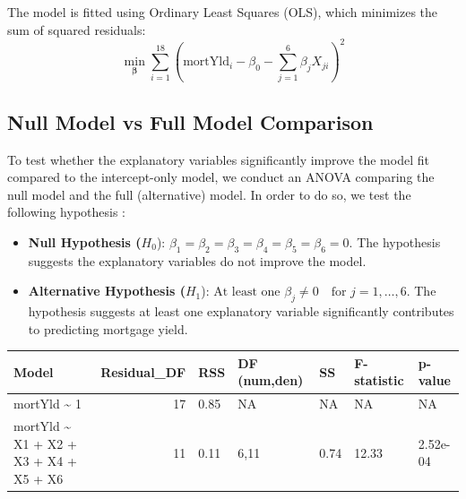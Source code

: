 \documentclass[
  12pt,
]{article}
\begin{document}
\vspace{0.2cm}

The model is fitted using Ordinary Least Squares (OLS), which minimizes
the sum of squared residuals:\\
\vspace{-0.2cm} \[
\min_{\boldsymbol\beta} \sum_{i=1}^{18} \left( \text{mortYld}_i - \beta_0 - \sum_{j=1}^{6} \beta_j X_{ji} \right)^2
\] \vspace{-0.3cm}

\subsection{Null Model vs Full Model
Comparison}\label{null-model-vs-full-model-comparison}

To test whether the explanatory variables significantly improve the
model fit compared to the intercept-only model, we conduct an ANOVA
comparing the null model and the full (alternative) model. In order to
do so, we test the following hypothesis :

\begin{itemize}
\item
  \textbf{Null Hypothesis (}\(H_0\)):
  \(\beta_1 = \beta_2 = \beta_3 = \beta_4 = \beta_5 = \beta_6 = 0\). The
  hypothesis suggests the explanatory variables do not improve the
  model.
\item
  \textbf{Alternative Hypothesis (}\(H_1\)):
  \(\text{At least one } \beta_j \neq 0 \quad \text{for } j = 1, \ldots, 6\).
  The hypothesis suggests at least one explanatory variable
  significantly contributes to predicting mortgage yield.
\end{itemize}

\begin{table}[!h]
\centering\begingroup\fontsize{8}{10}\selectfont

\begin{tabular}{lrlllll}
\toprule
Model & Residual\_DF & RSS & DF (num,den) & SS & F-statistic & p-value\\
\midrule
mortYld \textasciitilde{} 1 & 17 & 0.85 & NA & NA & NA & NA\\
mortYld \textasciitilde{} X1 + X2 + X3 + X4 + X5 + X6 & 11 & 0.11 & 6,11 & 0.74 & 12.33 & 2.52e-04\\
\bottomrule
\end{tabular}
\endgroup{}
\end{table}

\vspace{-0.2em}
\end{document}
